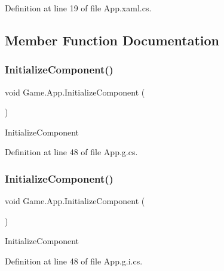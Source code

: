 Definition at line 19 of file App.\+xaml.\+cs.



\subsection{Member Function Documentation}
\mbox{\label{class_game_1_1_app_aebf9e516ecda0457e01ce402ca7d8f75}} 
\subsubsection{\texorpdfstring{InitializeComponent()}{InitializeComponent()}\hspace{0.1cm}{\footnotesize\ttfamily [1/2]}}
{\footnotesize\ttfamily void Game.\+App.\+Initialize\+Component (\begin{DoxyParamCaption}{ }\end{DoxyParamCaption})}



Initialize\+Component 



Definition at line 48 of file App.\+g.\+cs.

\mbox{\label{class_game_1_1_app_aebf9e516ecda0457e01ce402ca7d8f75}} 
\subsubsection{\texorpdfstring{InitializeComponent()}{InitializeComponent()}\hspace{0.1cm}{\footnotesize\ttfamily [2/2]}}
{\footnotesize\ttfamily void Game.\+App.\+Initialize\+Component (\begin{DoxyParamCaption}{ }\end{DoxyParamCaption})}



Initialize\+Component 



Definition at line 48 of file App.\+g.\+i.\+cs.

\mbox{\label{class_game_1_1_app_a853ce541182011b521a2e83950ab26b9}} 
